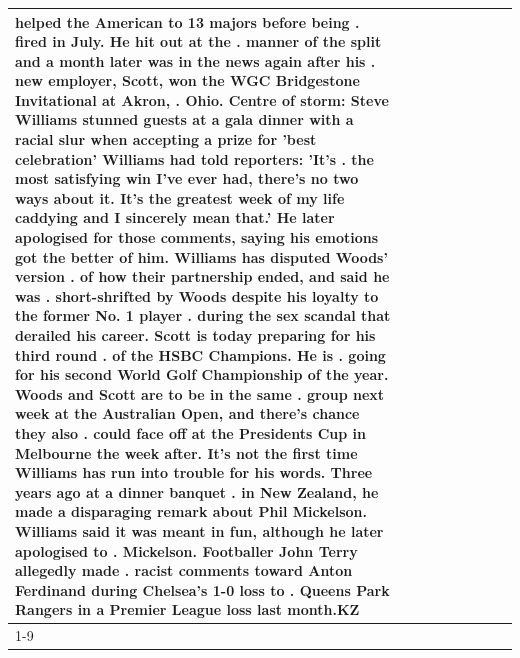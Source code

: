 \begin{table}[H]
\begin{tabular}{lllrlllll}
helped the American to 13 majors before being . fired in July. He hit out at the . manner of the split and a month later was in the news again after his . new employer, Scott, won the WGC Bridgestone Invitational at Akron, . Ohio. Centre of storm: Steve Williams stunned guests at a gala dinner with a racial slur when accepting a prize for 'best celebration' Williams had told reporters: 'It's . the most satisfying win I've ever had, there's no two ways about it. It's the greatest week of my life caddying and I sincerely mean that.' He later apologised for those comments, saying his emotions got the better of him. Williams has disputed Woods' version . of how their partnership ended, and said he was . short-shrifted by Woods despite his loyalty to the former No. 1 player . during the sex scandal that derailed his career. Scott is today preparing for his third round . of the HSBC Champions. He is . going for his second World Golf Championship of the year. Woods and Scott are to be in the same . group next week at the Australian Open, and there's chance they also . could face off at the Presidents Cup in Melbourne the week after. It's not the first time Williams has run into trouble for his words. Three years ago at a dinner banquet . in New Zealand, he made a disparaging remark about Phil Mickelson. Williams said it was meant in fun, although he later apologised to . Mickelson. Footballer John Terry allegedly made . racist comments toward Anton Ferdinand during Chelsea's 1-0 loss to . Queens Park Rangers in a Premier League loss last month.KZ \\
\cline{1-9}

\end{tabular}
\end{table}
